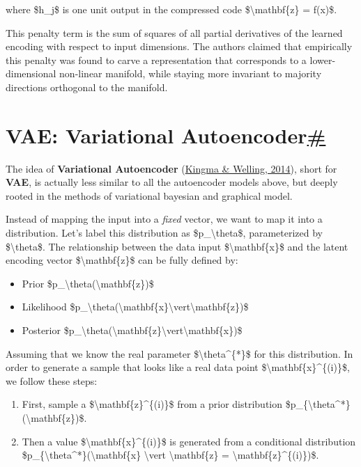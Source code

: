 where \$h\_j\$ is one unit output in the compressed code \$\textbackslash mathbf\{z\} = f(x)\$.

This penalty term is the sum of squares of all partial derivatives of the learned encoding with respect to input dimensions. The authors claimed that empirically this penalty was found to carve a representation that corresponds to a lower-dimensional non-linear manifold, while staying more invariant to majority directions orthogonal to the manifold.

\section{\texorpdfstring{VAE: Variational Autoencoder\hyperref[vae-variational-autoencoder]{\#}}{VAE: Variational Autoencoder\#}}\label{vae-variational-autoencoder}

The idea of \textbf{Variational Autoencoder} (\href{https://arxiv.org/abs/1312.6114}{Kingma \& Welling, 2014}), short for \textbf{VAE}, is actually less similar to all the autoencoder models above, but deeply rooted in the methods of variational bayesian and graphical model.

Instead of mapping the input into a \emph{fixed} vector, we want to map it into a distribution. Let's label this distribution as \$p\_\textbackslash theta\$, parameterized by \$\textbackslash theta\$. The relationship between the data input \$\textbackslash mathbf\{x\}\$ and the latent encoding vector \$\textbackslash mathbf\{z\}\$ can be fully defined by:

\begin{itemize}
\tightlist
\item
  Prior \$p\_\textbackslash theta(\textbackslash mathbf\{z\})\$
\item
  Likelihood \$p\_\textbackslash theta(\textbackslash mathbf\{x\}\textbackslash vert\textbackslash mathbf\{z\})\$
\item
  Posterior \$p\_\textbackslash theta(\textbackslash mathbf\{z\}\textbackslash vert\textbackslash mathbf\{x\})\$
\end{itemize}

Assuming that we know the real parameter \$\textbackslash theta\^{}\{*\}\$ for this distribution. In order to generate a sample that looks like a real data point \$\textbackslash mathbf\{x\}\^{}\{(i)\}\$, we follow these steps:

\begin{enumerate}
\tightlist
\item
  First, sample a \$\textbackslash mathbf\{z\}\^{}\{(i)\}\$ from a prior distribution \$p\_\{\textbackslash theta\^{}*\}(\textbackslash mathbf\{z\})\$.
\item
  Then a value \$\textbackslash mathbf\{x\}\^{}\{(i)\}\$ is generated from a conditional distribution \$p\_\{\textbackslash theta\^{}*\}(\textbackslash mathbf\{x\} \textbackslash vert \textbackslash mathbf\{z\} = \textbackslash mathbf\{z\}\^{}\{(i)\})\$.
\end{enumerate}

